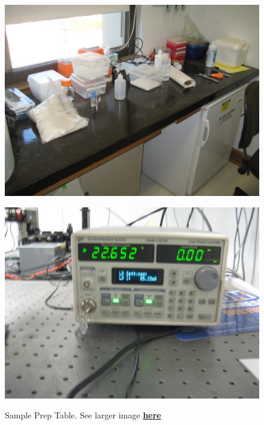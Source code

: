 \documentclass{../lab}
\begin{document}
\begin{figure}[h]
\begin{minipage}{0.32\textwidth}
    \href{http://experimentationlab.berkeley.edu/sites/default/files/images/OTZ_Table_3555.jpg}{\includegraphics[width=\linewidth,keepaspectratio]{images/OTZ_Table_3555.jpg}}
    \caption{Sample Prep Table. See larger image \href{http://experimentationlab.berkeley.edu/sites/default/files/images/OTZ_Table_3555.jpg}{\textbf{here}}}
\end{minipage}
\begin{minipage}{0.32\textwidth}
    \href{http://experimentationlab.berkeley.edu/sites/default/files/images/OTZ_Laser_Controller_3553.jpg}{\includegraphics[width=\linewidth,keepaspectratio]{images/OTZ_Laser_Controller_3553.jpg}}

\end{minipage}
\end{figure}
\end{document}
